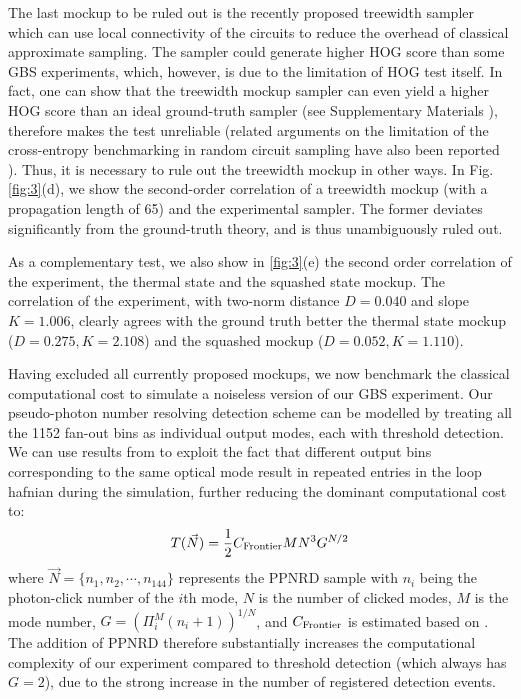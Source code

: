 \documentclass[aps,prl,groupedaddress,superscriptaddress,showpacs,reprint,nofootinbib,nolongbibliography]{revtex4-2}
\begin{document}
The last mockup to be ruled out is the recently proposed treewidth sampler \cite{ohClassicalSimulationBoson2022} which can use local connectivity of the circuits to reduce the overhead of classical approximate sampling. The sampler could generate higher HOG score than some GBS experiments, which, however, is due to the limitation of HOG test itself. In fact, one can show that the treewidth mockup sampler can even yield a higher HOG score than an ideal ground-truth sampler (see Supplementary Materials \cite{suppl}), therefore makes the test unreliable \cite{ohSpoofingCrossEntropy2022} (related arguments on the limitation of the cross-entropy benchmarking in random circuit sampling have also been reported \cite{barak2020spoofing, gaoLimitationsLinearCrossEntropy2021}). Thus, it is necessary to rule out the treewidth mockup in other ways. In Fig. \ref{fig:3}(d), we show the second-order correlation of a treewidth mockup (with a propagation length of 65) and the experimental sampler. The former deviates significantly from the ground-truth theory, and is thus unambiguously ruled out.

As a complementary test, we also show in \ref{fig:3}(e) the second order correlation of the experiment, the thermal state and the squashed state mockup. The correlation of the experiment, with two-norm distance $D=0.040$ and slope $K=1.006$, clearly agrees with the ground truth better the thermal state mockup ($D=0.275, K=2.108$) and the squashed mockup ($D=0.052, K=1.110$).

Having excluded all currently proposed mockups, we now benchmark the classical computational cost to simulate a noiseless version of our GBS experiment. Our pseudo-photon number resolving detection scheme can be modelled by treating all the 1152 fan-out bins as individual output modes, each with threshold detection. We can use results from \cite{bulmerBoundaryQuantumAdvantage2022} to exploit the fact that different output bins corresponding to the same optical mode result in repeated entries in the loop hafnian during the simulation, further reducing the dominant computational cost to:
\begin{equation}
    T(\vec{N})=\frac{1}{2}C_{\rm{F r o n t i e r}}M N^{3}G^{N/2}
    \label{eqn:3}
\end{equation}
where $\vec{N}=\{n_1,n_2,\cdots,n_{144}\}$ represents the PPNRD sample with $n_i$ being the photon-click number of the  $i$th mode, $N$ is the number of clicked modes, $M$ is the mode number, $G=\left(\Pi_{i}^{M}(n_{i}+1)\right)^{1/N}$, and $C_{\rm{F r o n t i e r}}$ is estimated based on \cite{madsenQuantumComputationalAdvantage2022}. The addition of PPNRD therefore substantially increases the computational complexity of our experiment compared to threshold detection (which always has $G=2$), due to the strong increase in the number of registered detection events.
\end{document}
